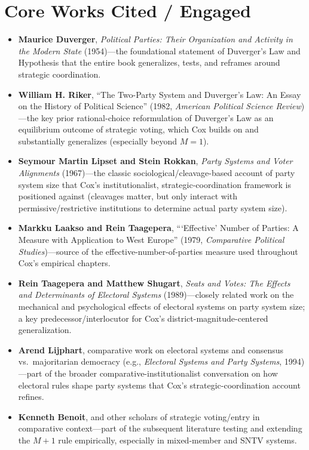 \documentclass[12pt]{article}
\begin{document}
\section{Core Works Cited / Engaged}

\begin{itemize}[leftmargin=*, itemsep=4pt]
    \item \textbf{Maurice Duverger}, \textit{Political Parties: Their Organization and Activity in the Modern State} (1954)---the foundational statement of Duverger's Law and Hypothesis that the entire book generalizes, tests, and reframes around strategic coordination.
    \item \textbf{William H. Riker}, ``The Two-Party System and Duverger's Law: An Essay on the History of Political Science'' (1982, \textit{American Political Science Review})---the key prior rational-choice reformulation of Duverger's Law as an equilibrium outcome of strategic voting, which Cox builds on and substantially generalizes (especially beyond $M=1$).
    \item \textbf{Seymour Martin Lipset and Stein Rokkan}, \textit{Party Systems and Voter Alignments} (1967)---the classic sociological/cleavage-based account of party system size that Cox's institutionalist, strategic-coordination framework is positioned against (cleavages matter, but only interact with permissive/restrictive institutions to determine actual party system size).
    \item \textbf{Markku Laakso and Rein Taagepera}, ```Effective' Number of Parties: A Measure with Application to West Europe'' (1979, \textit{Comparative Political Studies})---source of the effective-number-of-parties measure used throughout Cox's empirical chapters.
    \item \textbf{Rein Taagepera and Matthew Shugart}, \textit{Seats and Votes: The Effects and Determinants of Electoral Systems} (1989)---closely related work on the mechanical and psychological effects of electoral systems on party system size; a key predecessor/interlocutor for Cox's district-magnitude-centered generalization.
    \item \textbf{Arend Lijphart}, comparative work on electoral systems and consensus vs.\ majoritarian democracy (e.g., \textit{Electoral Systems and Party Systems}, 1994)---part of the broader comparative-institutionalist conversation on how electoral rules shape party systems that Cox's strategic-coordination account refines.
    \item \textbf{Kenneth Benoit}, and other scholars of strategic voting/entry in comparative context---part of the subsequent literature testing and extending the $M+1$ rule empirically, especially in mixed-member and SNTV systems.

\end{itemize}
\end{document}
